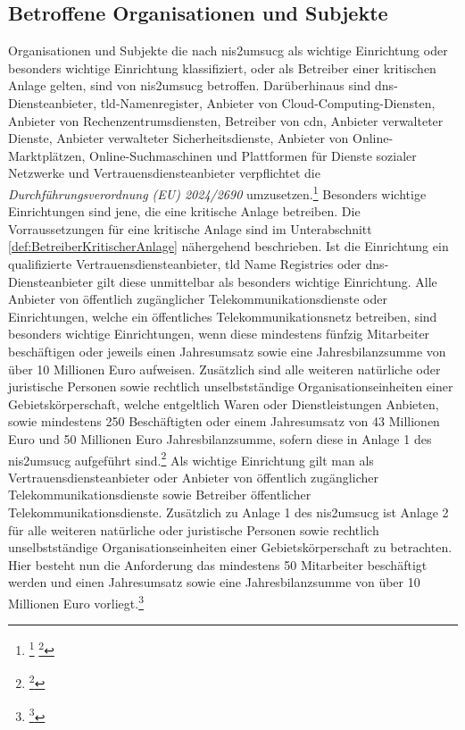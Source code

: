 \documentclass[11pt,a4paper,hidelinks]{article}   %
\begin{document}
        \subsection{Betroffene Organisationen und Subjekte}
        Organisationen und Subjekte die nach \gls{nis2umsucg} als wichtige Einrichtung oder besonders wichtige Einrichtung klassifiziert, oder als Betreiber einer kritischen Anlage gelten, sind von \gls{nis2umsucg} betroffen. Darüberhinaus sind \gls{dns}-Diensteanbieter, \gls{tld}-Namenregister, Anbieter von Cloud-Computing-Diensten, Anbieter von Rechenzent­rumsdiensten, Betreiber von \gls{cdn}, Anbieter verwalteter Dienste, Anbieter verwalteter Sicherheitsdienste, Anbieter von Online-Marktplätzen, Online-Suchmaschinen und Plattformen für Dienste sozialer Netzwerke und Vertrauensdiensteanbieter verpflichtet die \emph{Durchführungsverordnung (EU) 2024/2690} umzusetzen.\footnote{
            \footcite[Vgl.][, §30 Absatz 1, 2 \& 3]{NIS2UmsuCG}
            \footcite[Vgl.][, Absatz 1]{EU2024-2690}
        }\medbreak
        Besonders wichtige Einrichtungen sind jene, die eine kritische Anlage betreiben. Die Vorraussetzungen für eine kritische Anlage sind im Unterabschnitt \ref{def:BetreiberKritischerAnlage} nähergehend beschrieben. Ist die Einrichtung ein qualifizierte Vertrauensdiensteanbieter, \gls{tld} Name Registries oder \gls{dns}-Diensteanbieter gilt diese unmittelbar als besonders wichtige Einrichtung. Alle Anbieter von öffentlich zugänglicher Telekommunikationsdienste oder Einrichtungen, welche ein öffentliches Telekommunikationsnetz betreiben, sind besonders wichtige Einrichtungen, wenn diese mindestens fünfzig Mitarbeiter beschäftigen oder jeweils einen Jahresumsatz sowie eine Jahresbilanzsumme von über 10 Millionen Euro aufweisen. Zusätzlich sind alle weiteren natürliche oder juristische Personen sowie rechtlich unselbstständige Organisationseinheiten einer Gebietskörperschaft, welche entgeltlich Waren oder Dienstleistungen Anbieten, sowie mindestens 250 Beschäftigten oder einem Jahresumsatz von 43 Millionen Euro und 50 Millionen Euro Jahresbilanzsumme, sofern diese in Anlage 1 des \gls{nis2umsucg} aufgeführt sind.\footnote{
            \footcite[Vgl.][, §28 Absatz 1]{NIS2UmsuCG}
        }\medbreak
        Als wichtige Einrichtung gilt man als Vertrauensdiensteanbieter oder Anbieter von öffentlich zugänglicher Telekommunikationsdienste sowie Betreiber öffentlicher Telekommunikationsdienste. Zusätzlich zu Anlage 1 des \gls{nis2umsucg} ist Anlage 2 für alle weiteren natürliche oder juristische Personen sowie rechtlich unselbstständige Organisationseinheiten einer Gebietskörperschaft zu betrachten. Hier besteht nun die Anforderung das mindestens 50 Mitarbeiter beschäftigt werden und einen Jahresumsatz sowie eine Jahresbilanzsumme von über 10 Millionen Euro vorliegt.\footnote{
            \footcite[Vgl.][, §28 Absatz 2]{NIS2UmsuCG}
        }\medbreak
\end{document}
